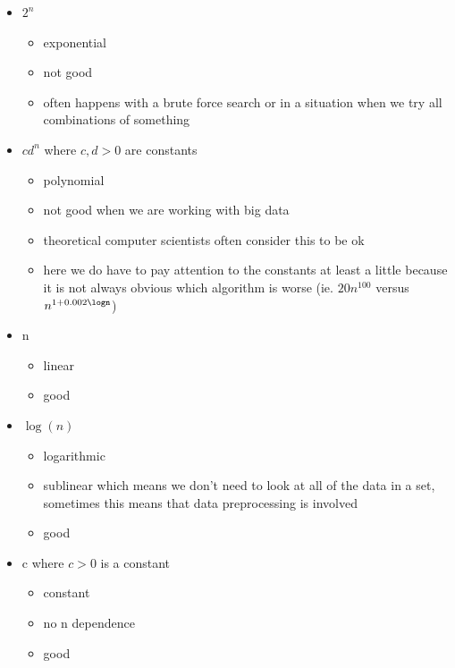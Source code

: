 \begin{itemize}
    \item $2^n$
    \begin{itemize}
        \item exponential
        \item not good
        \item often happens with a brute force search or in a situation when we try all combinations of something
    \end{itemize}
    \item $cd^n$ where $c, d > 0$ are constants
    \begin{itemize}
        \item polynomial
        \item not good when we are working with big data
        \item theoretical computer scientists often consider this to be ok
        \item here we do have to pay attention to the constants at least a little because it is not always obvious which algorithm is worse (ie. $20n^{100}$ versus $n^{1+0.002\logn}$)
    \end{itemize}
    \item n
    \begin{itemize}
        \item linear
        \item good
    \end{itemize}
    \item $\log(n)$
    \begin{itemize}
        \item logarithmic
        \item sublinear which means we don't need to look at all of the data in a set, sometimes this means that data preprocessing is involved
        \item good
    \end{itemize}
    \item c where $c>0$ is a constant
    \begin{itemize}
        \item constant
        \item no n dependence
        \item good
    \end{itemize}
\end{itemize}

